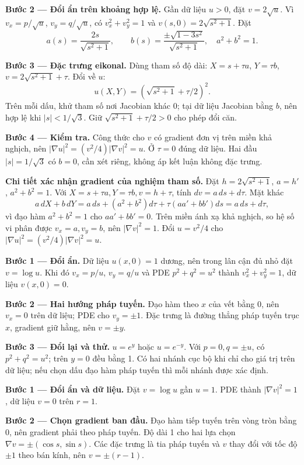 \textbf{Bước 2 — Đổi ẩn trên khoảng hợp lệ.} Gần dữ liệu $u>0$, đặt $v=2\sqrt u$. Vì $v_x=p/\sqrt u$, $v_y=q/\sqrt u$, có $v_x^2+v_y^2=1$ và $v(s,0)=2\sqrt{s^2+1}$. Đặt
\[a(s)=\frac{2s}{\sqrt{s^2+1}},\qquad b(s)=\frac{\pm\sqrt{1-3s^2}}{\sqrt{s^2+1}},\quad a^2+b^2=1.\]

\textbf{Bước 3 — Đặc trưng eikonal.} Dùng tham số độ dài: $X=s+\tau a$, $Y=\tau b$, $v=2\sqrt{s^2+1}+\tau$. Đổi về $u$:
\[u(X,Y)=(\sqrt{s^2+1}+\tau/2)^2.\]
Trên mỗi dấu, khử tham số nơi Jacobian khác 0; tại dữ liệu Jacobian bằng $b$, nên hợp lệ khi $|s|<1/\sqrt3$. Giữ $\sqrt{s^2+1}+\tau/2>0$ cho phép đổi căn.

\textbf{Bước 4 — Kiểm tra.} Công thức cho $v$ có gradient đơn vị trên miền khả nghịch, nên $|\nabla u|^2=(v^2/4)|\nabla v|^2=u$. Ở $\tau=0$ đúng dữ liệu. Hai đầu $|s|=1/\sqrt3$ có $b=0$, cần xét riêng, không áp kết luận không đặc trưng.

\textbf{Chi tiết xác nhận gradient của nghiệm tham số.} Đặt $h=2\sqrt{s^2+1}$, $a=h'$, $a^2+b^2=1$. Với $X=s+\tau a,Y=\tau b,v=h+\tau$, tính $dv=a\,ds+d\tau$. Mặt khác
\[a\,dX+b\,dY=a\,ds+(a^2+b^2)d\tau+\tau(aa'+bb')ds=a\,ds+d\tau,\]
vì đạo hàm $a^2+b^2=1$ cho $aa'+bb'=0$. Trên miền ánh xạ khả nghịch, so hệ số vi phân được $v_x=a,v_y=b$, nên $|\nabla v|^2=1$. Đổi $u=v^2/4$ cho $|\nabla u|^2=(v^2/4)|\nabla v|^2=u$.

\textbf{Bước 1 — Đổi ẩn.} Dữ liệu $u(x,0)=1$ dương, nên trong lân cận đủ nhỏ đặt $v=\log u$. Khi đó $v_x=p/u$, $v_y=q/u$ và PDE $p^2+q^2=u^2$ thành $v_x^2+v_y^2=1$, dữ liệu $v(x,0)=0$.

\textbf{Bước 2 — Hai hướng pháp tuyến.} Đạo hàm theo $x$ của vết bằng 0, nên $v_x=0$ trên dữ liệu; PDE cho $v_y=\pm1$. Đặc trưng là đường thẳng pháp tuyến trục $x$, gradient giữ hằng, nên $v=\pm y$.

\textbf{Bước 3 — Đổi lại và thử.} $u=e^y$ hoặc $u=e^{-y}$. Với $p=0,q=\pm u$, có $p^2+q^2=u^2$; trên $y=0$ đều bằng 1. Có hai nhánh cục bộ khi chỉ cho giá trị trên dữ liệu; nếu chọn dấu đạo hàm pháp tuyến thì mỗi nhánh được xác định.

\textbf{Bước 1 — Đổi ẩn và dữ liệu.} Đặt $v=\log u$ gần $u=1$. PDE thành $|\nabla v|^2=1$, dữ liệu $v=0$ trên $r=1$.

\textbf{Bước 2 — Chọn gradient ban đầu.} Đạo hàm tiếp tuyến trên vòng tròn bằng 0, nên gradient phải theo pháp tuyến. Độ dài 1 cho hai lựa chọn $\nabla v=\pm(\cos s,\sin s)$. Các đặc trưng là tia pháp tuyến và $v$ thay đổi với tốc độ $\pm1$ theo bán kính, nên $v=\pm(r-1)$.

